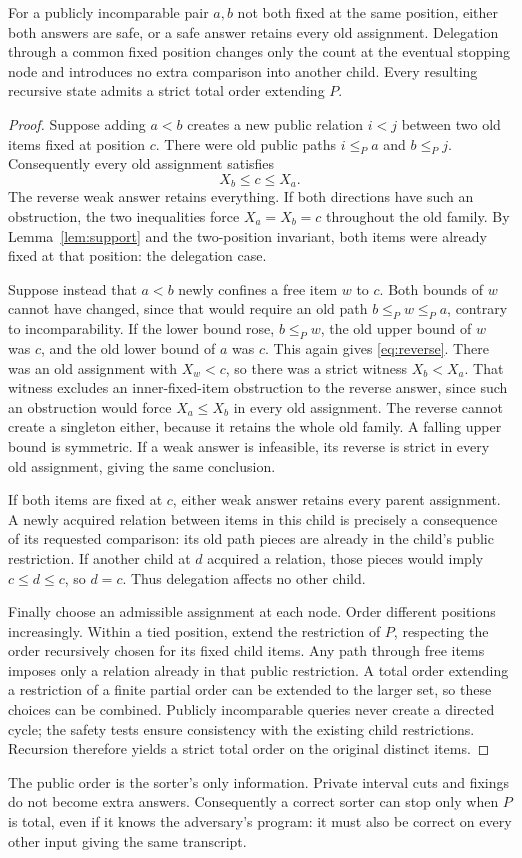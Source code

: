 \begin{lemma}
\label{lem:routing}
For a publicly incomparable pair $a,b$ not both fixed at the same position,
either both answers are safe, or a safe answer retains every old assignment.
Delegation through a common fixed position changes only the count at the
eventual stopping node and introduces no extra comparison into another child.
Every resulting recursive state admits a strict total order extending $P$.
\end{lemma}
\begin{proof}
Suppose adding $a<b$ creates a new public relation $i<j$ between two old
items fixed at position $c$. There were old public paths
$i\leq_P a$ and $b\leq_P j$. Consequently every old assignment satisfies
\begin{equation}
                         X_b\leq c\leq X_a.
\label{eq:reverse}
\end{equation}
The reverse weak answer retains everything. If both directions have such
an obstruction, the two inequalities force $X_a=X_b=c$ throughout the
old family. By Lemma~\ref{lem:support} and the two-position invariant,
both items were already fixed at that position: the delegation case.

Suppose instead that $a<b$ newly confines a free item $w$ to $c$.
Both bounds of $w$ cannot have changed, since that would require an old
path $b\leq_P w\leq_P a$, contrary to incomparability.
If the lower bound rose, $b\leq_P w$, the old upper bound of $w$ was
$c$, and the old lower bound of $a$ was $c$. This again gives
\eqref{eq:reverse}. There was an old assignment with $X_w<c$, so there
was a strict witness $X_b<X_a$. That witness excludes an inner-fixed-item
obstruction to the reverse answer, since such an obstruction would force
$X_a\leq X_b$ in every old assignment. The reverse cannot create a
singleton either, because it retains the whole old family. A falling upper
bound is symmetric. If a weak answer is infeasible, its reverse is strict
in every old assignment, giving the same conclusion.

If both items are fixed at $c$, either weak answer retains every parent
assignment. A newly acquired relation between items in this child is
precisely a consequence of its requested comparison: its old path pieces
are already in the child's public restriction. If another child at $d$
acquired a relation, those pieces would imply $c\leq d\leq c$, so
$d=c$. Thus delegation affects no other child.

Finally choose an admissible assignment at each node. Order different
positions increasingly. Within a tied position, extend the restriction of
$P$, respecting the order recursively chosen for its fixed child items.
Any path through free items imposes only a relation already in that public
restriction. A total order extending a restriction of a finite partial order
can be extended to the larger set, so these choices can be combined.
Publicly incomparable queries never create a directed cycle; the safety
tests ensure consistency with the existing child restrictions. Recursion
therefore yields a strict total order on the original distinct items.
\end{proof}

The public order is the sorter's only information. Private interval cuts and
fixings do not become extra answers. Consequently a correct sorter can stop
only when $P$ is total, even if it knows the adversary's program: it must also
be correct on every other input giving the same transcript.
